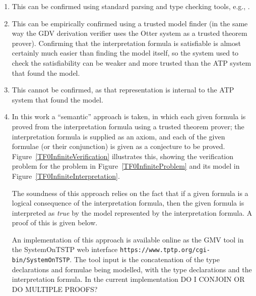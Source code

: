\documentclass[letterpaper]{article}
\newcommand{\smalltt}[1]{\small \texttt{#1}}
\begin{document}
\begin{enumerate}
\item This can be confirmed using standard parsing and type checking tools, e.g., \cite{VS06,HR15}.
\item This can be empirically confirmed using a trusted model finder (in the same way the GDV 
      derivation verifier \cite{Sut06} uses the Otter system \cite{McC03-Otter} as a trusted 
      theorem prover).
      Confirming that the \small{interpretation} formula is satisfiable is almost certainly much 
      easier than finding the model itself, so the system used to check the satisfiability can 
      be weaker and more trusted than the ATP system that found the model.
\item This cannot be confirmed, as that representation is internal to the ATP system that found
      the model.
\item In this work a ``semantic'' approach is taken, in which each given formula is proved from
      the interpretation formula using a trusted theorem prover; the interpretation formula is 
      supplied as an axiom, and each of the given formulae (or their conjunction) is given as a 
      conjecture to be proved.
      Figure~\ref{TF0InfiniteVerification} illustrates this, showing the verification 
      problem for the problem in Figure~\ref{TF0InfiniteProblem} and its model in 
      Figure~\ref{TF0InfiniteInterpretation}.

      The soundness of this approach relies on the fact that if a given formula is a logical 
      consequence of the interpretation formula, then the given formula is interpreted as 
      {\em true} by the model represented by the interpretation formula.
      A proof of this is given below.

      An implementation of this approach is available online as the GMV tool in the SystemOnTSTP
      \cite{Sut07-CSR} web interface {\smalltt{https://www.tptp.org/cgi-bin/SystemOnTSTP}}.
      The tool input is the concatenation of the type declarations and formulae being modelled, 
      with the type declarations and the interpretation formula.
      In the current implementation DO I CONJOIN OR DO MULTIPLE PROOFS?
\end{enumerate}
\end{document}
